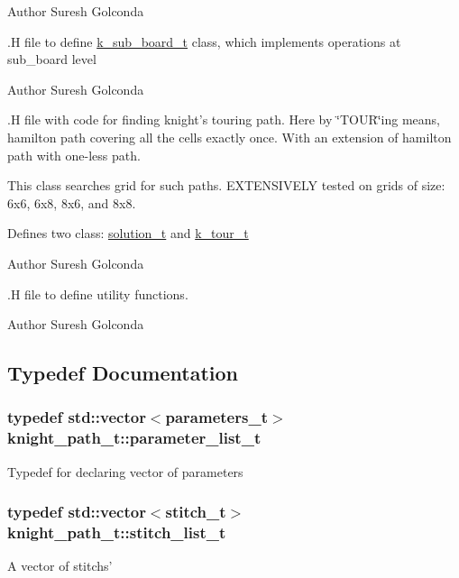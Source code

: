 \begin{DoxyAuthor}{\-Author}
\-Suresh \-Golconda
\end{DoxyAuthor}
.\-H file to define \hyperlink{classknight__path__t_1_1k__sub__board__t}{k\-\_\-sub\-\_\-board\-\_\-t} class, which implements operations at sub\-\_\-board level

\begin{DoxyAuthor}{\-Author}
\-Suresh \-Golconda
\end{DoxyAuthor}
.\-H file with code for finding knight's touring path. \-Here by \char`\"{}\-T\-O\-U\-R\char`\"{}ing means, hamilton path covering all the cells exactly once. \-With an extension of hamilton path with one-\/less path.

\-This class searches grid for such paths. \-E\-X\-T\-E\-N\-S\-I\-V\-E\-L\-Y tested on grids of size\-: 6x6, 6x8, 8x6, and 8x8.

\-Defines two class\-: \hyperlink{classknight__path__t_1_1solution__t}{solution\-\_\-t} and \hyperlink{classknight__path__t_1_1k__tour__t}{k\-\_\-tour\-\_\-t}

\begin{DoxyAuthor}{\-Author}
\-Suresh \-Golconda
\end{DoxyAuthor}
.\-H file to define utility functions.

\begin{DoxyAuthor}{\-Author}
\-Suresh \-Golconda 
\end{DoxyAuthor}


\subsection{\-Typedef \-Documentation}
\hypertarget{namespaceknight__path__t_a50060ec18677595e6da97bc413ddc016}{
\subsubsection[{parameter\-\_\-list\-\_\-t}]{\setlength{\rightskip}{0pt plus 5cm}typedef std\-::vector$<${\bf parameters\-\_\-t}$>$ {\bf knight\-\_\-path\-\_\-t\-::parameter\-\_\-list\-\_\-t}}}\label{namespaceknight__path__t_a50060ec18677595e6da97bc413ddc016}
\-Typedef for declaring vector of parameters \hypertarget{namespaceknight__path__t_ab13938a6b52c0039f4123b0fe02e6ef4}{
\subsubsection[{stitch\-\_\-list\-\_\-t}]{\setlength{\rightskip}{0pt plus 5cm}typedef std\-::vector$<${\bf stitch\-\_\-t}$>$ {\bf knight\-\_\-path\-\_\-t\-::stitch\-\_\-list\-\_\-t}}}\label{namespaceknight__path__t_ab13938a6b52c0039f4123b0fe02e6ef4}
\-A vector of stitchs' 

